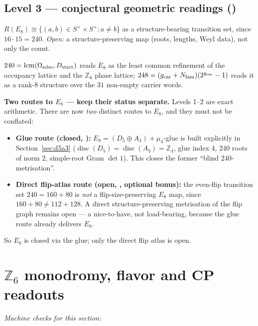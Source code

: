 \subsection{Level 3 --- conjectural geometric readings (\mC)}
\begin{conjecture}
$R(E_8)\cong\{(a,b)\in S^+\times S^+: a\neq b\}$ as a structure-bearing transition set, since
$16\cdot15=240$. \emph{Open:} a structure-preserving map (roots, lengths, Weyl data), not only the
count.
\end{conjecture}
\begin{conjecture}
$240=\operatorname{lcm}(\Omega_{\mathrm{adm}},D_{\mathrm{start}})$ reads $E_8$ as the least common refinement of the occupancy
lattice and the $\mathbb Z_6$ phase lattice; $248=(g_{\mathrm{car}}+N_{\mathrm{fam}})(2^{g_{\mathrm{car}}}-1)$ reads it as a rank-$8$
structure over the $31$ non-empty carrier words.
\end{conjecture}
\par\smallskip\noindent\textbf{Two routes to $E_8$ --- keep their status separate.}
Levels 1--2 are exact arithmetic. There are now \emph{two} distinct routes to $E_8$, and they must not
be conflated:
\begin{itemize}
\item \textbf{Glue route (closed, \mE):} $E_8=(D_5\oplus A_3)+\mu_4$-glue is built explicitly in
Section~\ref{sec:d5a3} ($\operatorname{disc}(D_5)=\operatorname{disc}(A_3)=\mathbb Z_4$, glue index $4$,
$240$ roots of norm $2$, simple-root Gram $\det 1$). This closes the former ``blind $240$-metrisation''.
\item \textbf{Direct flip-atlas route (open, \mO, optional bonus):} the even-flip transition set
$240=160+80$ is \emph{not} a flip-size-preserving $E_8$ map, since $160+80\neq 112+128$. A direct
structure-preserving metrisation of the flip graph remains open --- a nice-to-have, not load-bearing,
because the glue route already delivers $E_8$.
\end{itemize}
So $E_8$ is closed via the glue; only the direct flip atlas is open.
\par\smallskip

\section{$\mathbb Z_6$ monodromy, flavor and CP readouts}
\noindent\emph{Machine checks for this section:} 


